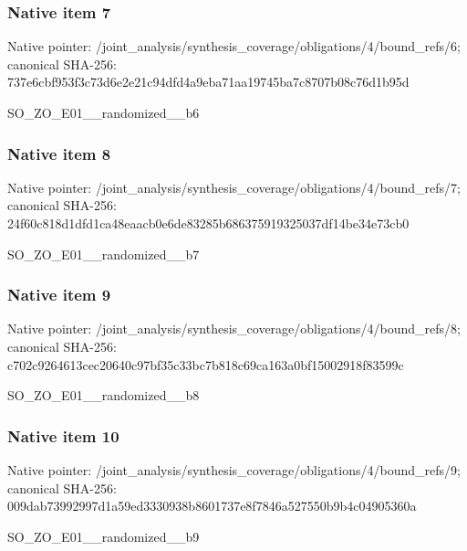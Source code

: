 \documentclass[10pt,a4paper]{article}
\begin{document}
\subsubsection{Native item 7}
Native pointer: /joint\_\allowbreak{}analysis/synthesis\_\allowbreak{}coverage/obligations/4/bound\_\allowbreak{}refs/6; canonical SHA-256: 737e6cbf953f3c73d6e2e21c94dfd4a9eba71aa19745ba7c8707b08c76d1b95d

\begingroup\raggedright\sloppy SO\_\allowbreak{}ZO\_\allowbreak{}E01\_\allowbreak{}\_\allowbreak{}randomized\_\allowbreak{}\_\allowbreak{}b6\par\endgroup

\subsubsection{Native item 8}
Native pointer: /joint\_\allowbreak{}analysis/synthesis\_\allowbreak{}coverage/obligations/4/bound\_\allowbreak{}refs/7; canonical SHA-256: 24f60c818d1dfd1ca48eaacb0e6de83285b686375919325037df14be34e73cb0

\begingroup\raggedright\sloppy SO\_\allowbreak{}ZO\_\allowbreak{}E01\_\allowbreak{}\_\allowbreak{}randomized\_\allowbreak{}\_\allowbreak{}b7\par\endgroup

\subsubsection{Native item 9}
Native pointer: /joint\_\allowbreak{}analysis/synthesis\_\allowbreak{}coverage/obligations/4/bound\_\allowbreak{}refs/8; canonical SHA-256: c702c9264613cec20640c97bf35c33bc7b818c69ca163a0bf15002918f83599c

\begingroup\raggedright\sloppy SO\_\allowbreak{}ZO\_\allowbreak{}E01\_\allowbreak{}\_\allowbreak{}randomized\_\allowbreak{}\_\allowbreak{}b8\par\endgroup

\subsubsection{Native item 10}
Native pointer: /joint\_\allowbreak{}analysis/synthesis\_\allowbreak{}coverage/obligations/4/bound\_\allowbreak{}refs/9; canonical SHA-256: 009dab73992997d1a59ed3330938b8601737e8f7846a527550b9b4c04905360a

\begingroup\raggedright\sloppy SO\_\allowbreak{}ZO\_\allowbreak{}E01\_\allowbreak{}\_\allowbreak{}randomized\_\allowbreak{}\_\allowbreak{}b9\par\endgroup
\end{document}
